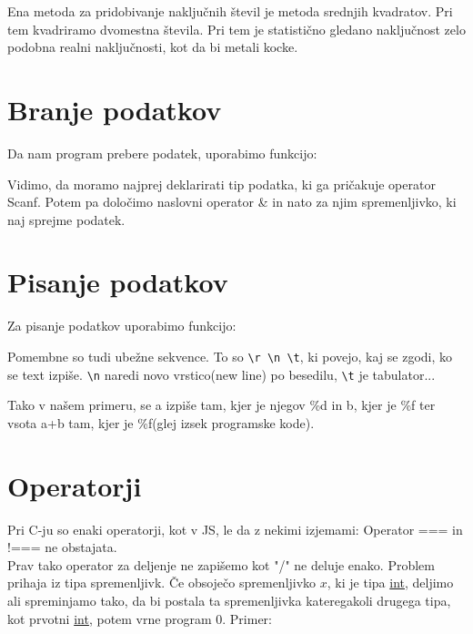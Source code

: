 \documentclass[a4paper, 12pt]{article}
\begin{document}
Ena metoda za pridobivanje naključnih števil je metoda srednjih kvadratov.
Pri tem kvadriramo dvomestna števila. Pri tem je statistično gledano naključnost zelo podobna realni naključnosti, kot da bi metali kocke.

\section{Branje podatkov}

Da nam program prebere podatek, uporabimo funkcijo:

{\centering{}\par}

Vidimo, da moramo najprej deklarirati tip podatka, ki ga pričakuje operator Scanf. Potem pa določimo naslovni operator \& in nato za njim spremenljivko, ki naj sprejme podatek.

\section{Pisanje podatkov}

Za pisanje podatkov uporabimo funkcijo:

{\centering{}\par}

Pomembne so tudi ubežne sekvence. To so \texttt{\textbackslash r \textbackslash n \textbackslash t}, ki povejo, kaj se zgodi, ko se text izpiše. \texttt{\textbackslash n} naredi novo vrstico(new line) po besedilu, \texttt{\textbackslash t} je tabulator...\

Tako v našem primeru, se a izpiše tam, kjer je njegov \%d in b, kjer je \%f ter vsota a+b tam, kjer je \%f(glej izsek programske kode).

\section{Operatorji}

Pri C-ju so enaki operatorji, kot v JS, le da z nekimi izjemami: Operator === in !=== ne obstajata.\\
Prav tako operator za deljenje ne zapišemo kot "/" ne deluje enako. Problem prihaja iz tipa spremenljivk. Če obsoječo spremenljivko $x$, ki je tipa \underline{int}, deljimo ali spreminjamo tako, da bi postala ta spremenljivka kateregakoli drugega tipa, kot prvotni \underline{int}, potem vrne program 0. Primer:
\end{document}
